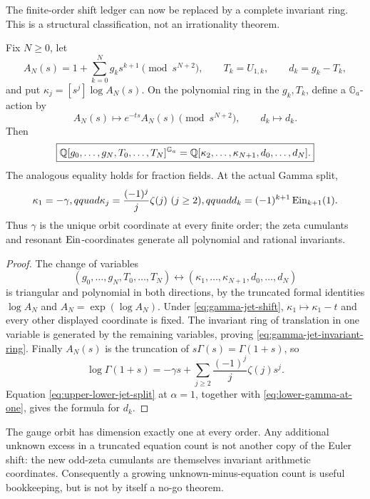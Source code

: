 The finite-order shift ledger can now be replaced by a complete invariant
ring.  This is a structural classification, not an irrationality theorem.

\begin{proposition}
\label{prop:finite-gamma-jet-quotient}
Fix \(N\ge0\), let
\[
 A_N(s)=1+\sum_{k=0}^Ng_ks^{k+1}\pmod {s^{N+2}},
 \qquad T_k=U_{1,k},\qquad d_k=g_k-T_k,
\]
and put \(\kappa_j=[s^j]\log A_N(s)\).  On the polynomial ring in the
\(g_k,T_k\), define a \(\mathbb G_a\)-action by
\begin{equation}\label{eq:gamma-jet-shift}
 A_N(s)\longmapsto e^{-ts}A_N(s)\pmod {s^{N+2}},
 \qquad d_k\longmapsto d_k.
\end{equation}
Then
\begin{equation}\label{eq:gamma-jet-invariant-ring}
 \boxed{\displaystyle
 \mathbb Q[g_0,\ldots,g_N,T_0,\ldots,T_N]^{\mathbb G_a}
 =\mathbb Q[\kappa_2,\ldots,\kappa_{N+1},d_0,\ldots,d_N].}
\end{equation}
The analogous equality holds for fraction fields.  At the actual Gamma
split,
\begin{equation}\label{eq:actual-gamma-jet-invariants}
 \kappa_1=-\gamma,qquad
 \kappa_j=\frac{(-1)^j}{j}\zeta(j)\ (j\ge2),qquad
 d_k=(-1)^{k+1}\operatorname{Ein}_{k+1}(1).
\end{equation}
Thus \(\gamma\) is the unique orbit coordinate at every finite order; the
zeta cumulants and resonant \(\operatorname{Ein}\)-coordinates generate all polynomial
and rational invariants.
\end{proposition}

\begin{proof}
The change of variables
\[
 (g_0,\ldots,g_N,T_0,\ldots,T_N)
 \longleftrightarrow
 (\kappa_1,\ldots,\kappa_{N+1},d_0,\ldots,d_N)
\]
is triangular and polynomial in both directions, by the truncated formal
identities \(\log A_N\) and \(A_N=\exp(\log A_N)\).  Under
\eqref{eq:gamma-jet-shift}, \(\kappa_1\mapsto\kappa_1-t\) and every other
displayed coordinate is fixed.  The invariant ring of translation in one
variable is generated by the remaining variables, proving
\eqref{eq:gamma-jet-invariant-ring}.  Finally
\(A_N(s)\) is the truncation of
\(s\Gamma(s)=\Gamma(1+s)\), so
\[
 \log\Gamma(1+s)=-\gamma s+
 \sum_{j\ge2}\frac{(-1)^j}{j}\zeta(j)s^j.
\]
Equation \eqref{eq:upper-lower-jet-split} at \(\alpha=1\), together with
\eqref{eq:lower-gamma-at-one}, gives the formula for \(d_k\).
\end{proof}

\begin{remark}
The gauge orbit has dimension exactly one at every order.  Any additional
unknown excess in a truncated equation count is not another copy of the
Euler shift: the new odd-zeta cumulants are themselves invariant arithmetic
coordinates.  Consequently a growing unknown-minus-equation count is useful
bookkeeping, but is not by itself a no-go theorem.
\end{remark}

